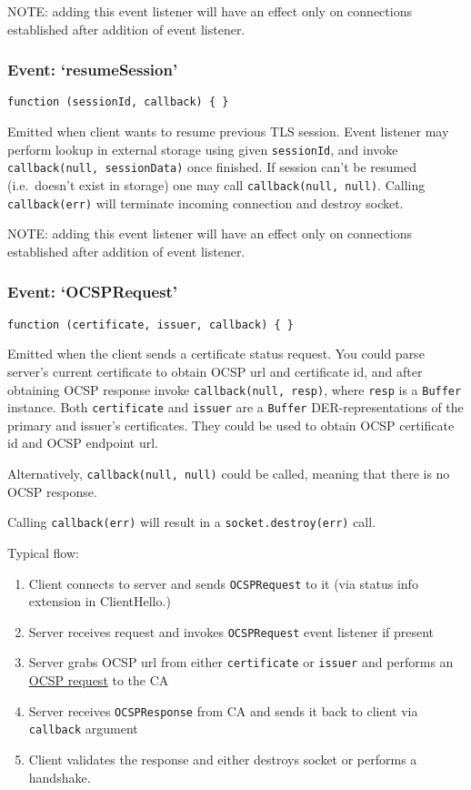 NOTE: adding this event listener will have an effect only on connections
established after addition of event listener.

\subsubsection{Event: `resumeSession'}\label{event-resumesession}

\texttt{function (sessionId, callback) \{ \}}

Emitted when client wants to resume previous TLS session. Event listener
may perform lookup in external storage using given \texttt{sessionId},
and invoke \texttt{callback(null, sessionData)} once finished. If
session can't be resumed (i.e.~doesn't exist in storage) one may call
\texttt{callback(null, null)}. Calling \texttt{callback(err)} will
terminate incoming connection and destroy socket.

NOTE: adding this event listener will have an effect only on connections
established after addition of event listener.

\subsubsection{Event: `OCSPRequest'}\label{event-ocsprequest}

\texttt{function (certificate, issuer, callback) \{ \}}

Emitted when the client sends a certificate status request. You could
parse server's current certificate to obtain OCSP url and certificate
id, and after obtaining OCSP response invoke
\texttt{callback(null, resp)}, where \texttt{resp} is a \texttt{Buffer}
instance. Both \texttt{certificate} and \texttt{issuer} are a
\texttt{Buffer} DER-representations of the primary and issuer's
certificates. They could be used to obtain OCSP certificate id and OCSP
endpoint url.

Alternatively, \texttt{callback(null, null)} could be called, meaning
that there is no OCSP response.

Calling \texttt{callback(err)} will result in a
\texttt{socket.destroy(err)} call.

Typical flow:

\begin{enumerate}
\def\labelenumi{\arabic{enumi}.}
\itemsep1pt\parskip0pt
\item
  Client connects to server and sends \texttt{OCSPRequest} to it (via
  status info extension in ClientHello.)
\item
  Server receives request and invokes \texttt{OCSPRequest} event
  listener if present
\item
  Server grabs OCSP url from either \texttt{certificate} or
  \texttt{issuer} and performs an
  \href{http://en.wikipedia.org/wiki/OCSP_stapling}{OCSP request} to the
  CA
\item
  Server receives \texttt{OCSPResponse} from CA and sends it back to
  client via \texttt{callback} argument
\item
  Client validates the response and either destroys socket or performs a
  handshake.
\end{enumerate}

